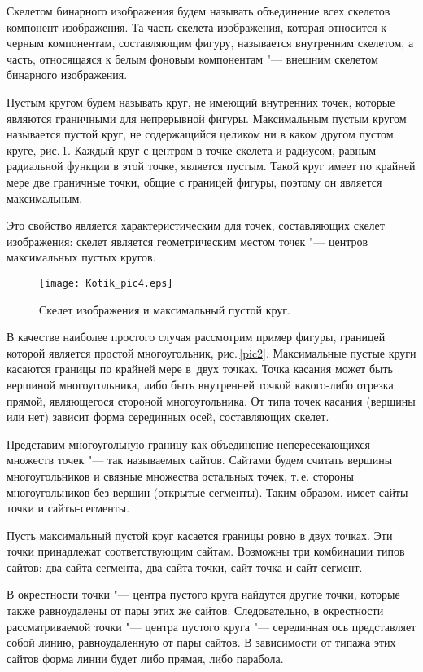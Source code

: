 \documentclass[twoside]{article}
\begin{document}
Скелетом бинарного изображения будем называть объединение всех скелетов компонент изображения. Та часть скелета изображения, которая относится к черным компонентам, составляющим фигуру, называется внутренним скелетом, а часть, относящаяся к белым фоновым компонентам "--- внешним скелетом бинарного изображения.

Пустым кругом будем называть круг, не имеющий внутренних точек, которые являются граничными для непрерывной фигуры. Максимальным пустым кругом называется пустой круг, не содержащийся целиком ни в каком другом пустом круге, рис.\,\ref{pic1}. Каждый круг с центром в точке скелета и радиусом, равным радиальной функции в этой точке, является пустым. Такой круг имеет по крайней мере две граничные точки, общие с границей фигуры, поэтому он является максимальным.

Это свойство является характеристическим для точек, составляющих скелет изображения: скелет является геометрическим местом точек "--- центров максимальных пустых кругов.

\begin{figure}[t]
  \centering
   \texttt{[image: Kotik\_pic4.eps]}
  \caption{Скелет изображения и максимальный пустой круг.}
  \label{pic1}
\end{figure}

В качестве наиболее простого случая рассмотрим пример фигуры, границей которой является простой многоугольник, рис.\,\ref{pic2}. Максимальные пустые круги касаются границы по крайней мере в~двух точках. Точка касания может быть вершиной многоугольника, либо быть внутренней точкой какого-либо отрезка прямой, являющегося стороной многоугольника. От типа точек касания (вершины или нет)  зависит форма серединных осей, составляющих скелет.

Представим многоугольную границу как объединение непересекающихся множеств точек "--- так называемых сайтов. Сайтами будем считать вершины многоугольников и связные множества остальных точек, т.\,е. стороны многоугольников без вершин (открытые сегменты). Таким образом, имеет сайты-точки и сайты-сегменты.

Пусть максимальный пустой круг касается границы ровно в двух точках. Эти точки принадлежат соответствующим сайтам. Возможны три комбинации типов сайтов: два сайта-сегмента, два сайта-точки, сайт-точка и сайт-сегмент.

В окрестности точки "--- центра пустого круга найдутся другие точки, которые также равноудалены от пары этих
же сайтов. Следовательно, в окрестности рассматриваемой точки "--- центра пустого круга "--- серединная ось представляет собой линию, равноудаленную от пары сайтов. В зависимости от типажа этих сайтов форма линии будет либо прямая, либо парабола.
\end{document}
